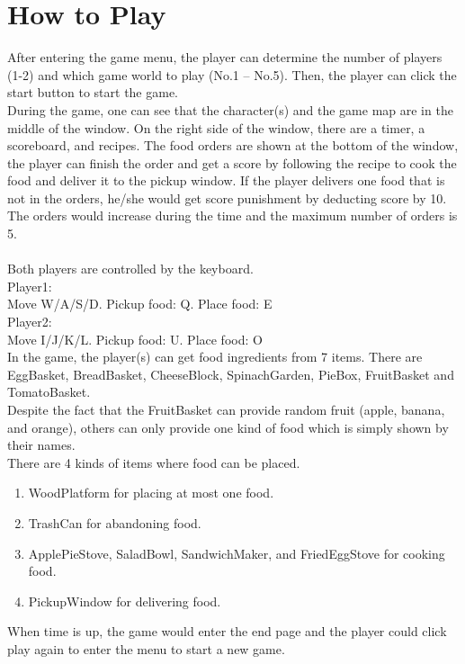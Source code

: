 \section{How to Play}

After entering the game menu, the player can determine the number of players (1-2) and which game world to play (No.1 – No.5). Then, the player can click the start button to start the game.\\
During the game, one can see that the character(s) and the game map are in the middle of the window. On the right side of the window, there are a timer, a scoreboard, and recipes. The food orders are shown at the bottom of the window, the player can finish the order and get a score by following the recipe to cook the food and deliver it to the pickup window. If the player delivers one food that is not in the orders, he/she would get score punishment by deducting score by 10. The orders would increase during the time and the maximum number of orders is 5.\\
\\
Both players are controlled by the keyboard.\\
Player1:\\
Move W/A/S/D. Pickup food: Q. Place food: E\\
Player2:\\
Move I/J/K/L. Pickup food: U. Place food: O\\
In the game, the player(s) can get food ingredients from 7 items. There are EggBasket, BreadBasket, CheeseBlock, SpinachGarden, PieBox, FruitBasket and TomatoBasket.\\
Despite the fact that the FruitBasket can provide random fruit (apple, banana, and orange), others can only provide one kind of food which is simply shown by their names.\\
There are 4 kinds of items where food can be placed.\\
\begin{enumerate}
	\item WoodPlatform for placing at most one food.
    \item TrashCan for abandoning food.
    \item ApplePieStove, SaladBowl, SandwichMaker, and FriedEggStove for cooking food.
    \item PickupWindow for delivering food.
\end{enumerate}
When time is up, the game would enter the end page and the player could click play again to enter the menu to start a new game.
